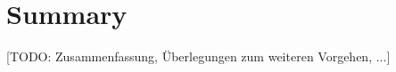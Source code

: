 \section{Summary}
\label{sec:summary}
[TODO: Zusammenfassung, Überlegungen zum weiteren Vorgehen, ...]